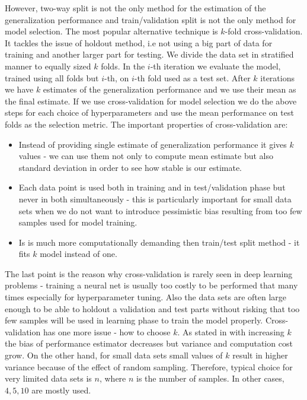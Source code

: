 \documentclass[12pt, wide]{mwart}
\begin{document}
However, two-way split is not the only method for the estimation of the generalization performance and train/validation split is not the only method for model selection. The most popular alternative technique is $k$-fold cross-validation. It tackles the issue of holdout method, i.e not using a big part of data for training and another larger part for testing. We divide the data set in stratified manner to equally sized $k$ folds. In the $i$-th iteration we evaluate the model, trained using all folds but $i$-th, on $i$-th fold used as a test set. After $k$ iterations we have $k$ estimates of the generalization performance and we use their mean as the final estimate. If we use cross-validation for model selection we do the above steps for each choice of hyperparameters and use the mean performance on test folds as the selection metric. The important properties of cross-validation are:
\begin{itemize}
    \item Instead of providing single estimate of generalization performance it gives $k$ values - we can use them not only to compute mean estimate but also standard deviation in order to see how stable is our estimate.
    \item Each data point is used both in training and in test/validation phase but never in both simultaneously - this is particularly important for small data sets when we do not want to introduce pessimistic bias resulting from too few samples used for model training.
    \item Is is much more computationally demanding then train/test split method - it fits $k$ model instead of one.
\end{itemize}
The last point is the reason why cross-validation is rarely seen in deep learning problems - training a neural net is usually too costly to be performed that many times especially for hyperparameter tuning. Also the data sets are often large enough to be able to holdout a validation and test parts without risking that too few samples will be used in learning phase to train the model properly. Cross-validation has one more issue - how to choose $k$. As stated in \cite{ModelSelection} with increasing $k$ the bias of performance estimator decreases but variance and computation cost grow. On the other hand, for small data sets small values of $k$ result in higher variance because of the effect of random sampling. Therefore, typical choice for very limited data sets is $n$, where $n$ is the number of samples. In other cases, $4,5,10$ are mostly used.  
\end{document}
